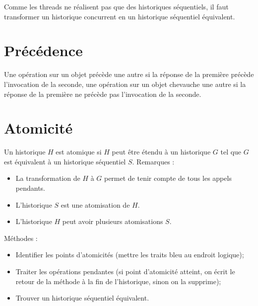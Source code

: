 \documentclass[11pt,a4paper]{report}
\begin{document}
Comme les threads ne réalisent pas que des historiques séquentiels, il faut transformer un historique concurrent en un historique séquentiel équivalent.

\section{Précédence} %
\label{sec:Précédence}

Une opération sur un objet précède une autre si la réponse de la première précède l'invocation de la seconde, une opération sur un objet chevauche une autre si la réponse de la première ne précède pas l'invocation de la seconde.


\section{Atomicité} %
\label{sec:Atomicité}

Un historique $H$ est atomique si $H$ peut être étendu à un historique $G$ tel que $G$ est équivalent à un historique séquentiel $S$. Remarques :
\begin{itemize}
    \item La transformation de $H$ à $G$ permet de tenir compte de tous les appels pendants.
    \item L'historique $S$ est une atomisation de $H$.
    \item L'historique $H$ peut avoir plusieurs atomisations $S$.
\end{itemize}

Méthodes :
\begin{itemize}
    \item Identifier les points d'atomicités (mettre les traits bleu au endroit logique);
    \item Traiter les opérations pendantes (si point d'atomicité atteint, on écrit le retour de la méthode à la fin de l'historique, sinon on la supprime);
    \item Trouver un historique séquentiel équivalent.
\end{itemize}


\end{document}

